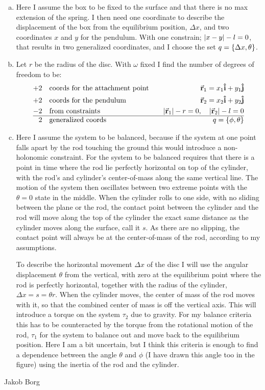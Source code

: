 \documentclass[11pt,a4paper]{report}
\newcounter{excount}[chapter]
\newenvironment{exercise}[1][]{\addtocounter{excount}{1} \noindent {\bf Problem
    \arabic{excount} \ \ #1}\hspace{2mm}}{\vspace{4mm}}
\newenvironment{solution}
    {\begin{tcolorbox}[title=Solution,halign lower=right,breakable]
    }
    {
    \tcblower Jakob Borg
    \end{tcolorbox}
	\vspace{5mm}
    }
\begin{document}
\begin{exercise}
\begin{solution}
\begin{enumerate}[a)]
	\item Here I assume the box to be fixed to the surface and that there is no max extension of the spring. I then need one coordinate to describe the displacement of the box from the equilibrium position, $\Delta x$, and two coordinates $x$ and $y$ for the pendulum. With one constrain; $\abs{x-y} -l = 0$, that results in two generalized coordinates, and I choose the set $q = \qty{\Delta x, \theta}$.
	\item Let $r$ be the radius of the disc. With $\omega$ fixed I find the number of degrees of freedom to be:
	\begin{align*}
	+2& \qq{coords for the attachment point} &\va{r}_1 = x_1\vu{i}+y_1\vu{j}
	\\
	+2& \qq{coords for the pendulum} &\va{r}_2 = x_2\vu{i}+y_2\vu{j}
	\\
	-2& \qq{from constraints} &\abs{\va{r}_1} - r = 0\qc \abs{\va{r}_2} - l = 0
	\\
	\hline
	2& \qq{generalized coords} & q = \qty{\phi,\theta}
	\end{align*}
	\item Here I assume the system to be balanced, because if the system at one point falls apart by the rod touching the ground this would introduce a non-holonomic constraint. For the system to be balanced requires that there is a point in time where the rod lie perfectly horizontal on top of the cylinder, with the rod's and cylinder's center-of-mass along the same vertical line. The motion of the system then oscillates between two extreme points with the $\theta = 0$ state in the middle. When the cylinder rolls to one side, with no sliding between the plane or the rod, the contact point between the cylinder and the rod will move along the top of the cylinder the exact same distance as the cylinder moves along the surface, call it $s$. As there are no slipping, the contact point will always be at the center-of-mass of the rod, according to my assumptions.

To describe the horizontal movement $\Delta x$ of the disc I will use the angular displacement $\theta$ from the vertical, with zero at the equilibrium point where the rod is perfectly horizontal, together with the radius of the cylinder, $\Delta x =s =  \theta r$. When the cylinder moves, the center of mass of the rod moves with it, so that the combined center of mass is off the vertical axis. This will introduce a torque on the system $\tau_2$ due to gravity. For my balance criteria this has to be counteracted by the torque from the rotational motion of the rod, $\tau_1$ for the system to balance out and move back to the equilibrium position. Here I am a bit uncertain, but I think this criteria is enough to find a dependence between the angle $\theta$ and $\phi$ (I have drawn this angle too in the figure) using the inertia of the rod and the cylinder. 


\end{enumerate}
\end{solution}
\end{exercise}
\end{document}
